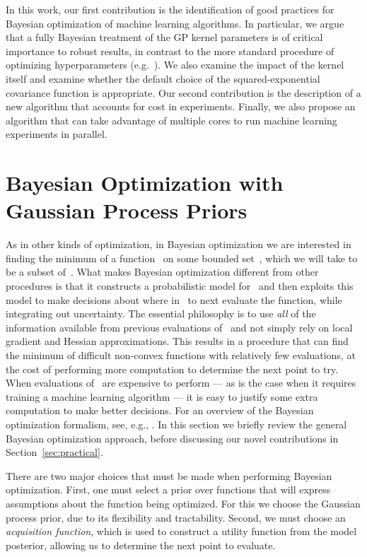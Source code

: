 \documentclass[aos,preprint]{imsart}
\begin{document}
In this work, our first contribution is the identification of good
practices for Bayesian optimization of machine learning algorithms.
In particular, we argue that a fully Bayesian treatment of the GP
kernel parameters is of critical importance to robust results, in
contrast to the more standard procedure of optimizing hyperparameters
(e.g.\ \citet{BergstraJ2011}).  We also examine the impact of the
kernel itself and examine whether the default choice of the
squared-exponential covariance function is appropriate.  Our second
contribution is the description of a new algorithm that accounts for
cost in experiments.  Finally, we also propose an algorithm that can
take advantage of multiple cores to run machine learning experiments
in parallel.

\section{Bayesian Optimization with Gaussian Process Priors}
As in other kinds of optimization, in Bayesian optimization we are
interested in finding the minimum of a function~ on some
bounded set~, which we will take to be a subset of~.
What makes Bayesian optimization different from other procedures is
that it constructs a probabilistic model for~ and then
exploits this model to make decisions about where in~ to next
evaluate the function, while integrating out uncertainty.  The
essential philosophy is to use \emph{all} of the information available
from previous evaluations of~ and not simply rely on local
gradient and Hessian approximations.  This results in a procedure that
can find the minimum of difficult non-convex functions with relatively
few evaluations, at the cost of performing more computation to
determine the next point to try.  When evaluations of~ are
expensive to perform --- as is the case when it requires training a
machine learning algorithm --- it is easy to justify some extra
computation to make better decisions.  For an overview of the Bayesian
optimization formalism, see, e.g., \citet{brochu-etal-2010a}.  In this
section we briefly review the general Bayesian optimization approach,
before discussing our novel contributions in
Section~\ref{sec:practical}.

There are two major choices that must be made when performing Bayesian
optimization.  First, one must select a prior over functions that will
express assumptions about the function being optimized.  For this we
choose the Gaussian process prior, due to its flexibility and
tractability.  Second, we must choose an \emph{acquisition function},
which is used to construct a utility function from the model
posterior, allowing us to determine the next point to evaluate.
\end{document}
